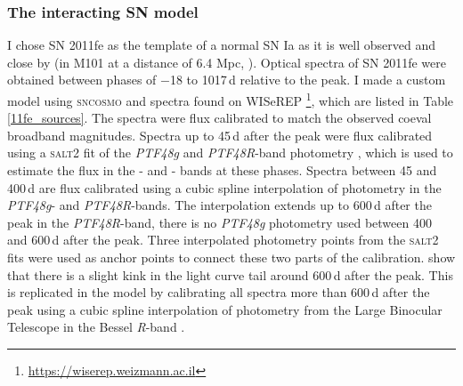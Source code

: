 \documentclass[a4paper,oneside,12pt, class=Latex/Classes/PhDthesisPSnPDF, crop=false]{standalone}
\begin{document}
\subsubsection{The interacting SN model}
\label{model_description}
I chose SN 2011fe as the template of a normal SN Ia as it is well observed and close by (in M101 at a distance of 6.4 Mpc, \citealt{M101_cep_dist}). Optical spectra of SN 2011fe were obtained between phases of $-$18 to 1017\,d relative to the peak. I made a custom model using \textsc{sncosmo} and spectra found on WISeREP \citep{wiserep}\footnote{\url{https://wiserep.weizmann.ac.il}}, which are listed in Table \ref{11fe_sources}. The spectra were flux calibrated to match the observed coeval broadband magnitudes. Spectra up to 45\,d after the peak were flux calibrated using a \textsc{salt2} \citep{salt2} fit of the \textit{PTF48g} and \textit{PTF48R}-band photometry \citep{PTF_1, PTF_2}, which is used to estimate the flux in the \ztfg- and \ztfr- bands at these phases. Spectra between 45 and 400\,d are flux calibrated using a cubic spline interpolation of photometry in the \textit{PTF48g}- and \textit{PTF48R}-bands. The interpolation extends up to 600\,d after the peak in the \textit{PTF48R}-band, there is no \textit{PTF48g} photometry used between 400 and 600\,d after the peak. Three interpolated photometry points from the \textsc{salt2} fits were used as anchor points to connect these two parts of the calibration. \citet{Georgios_11fe} show that there is a slight kink in the light curve tail around 600\,d after the peak. This is replicated in the model by calibrating all spectra more than 600\,d after the peak using a cubic spline interpolation of photometry from the Large Binocular Telescope \citep[LBT;][]{LBT} in the Bessel \textit{R}-band \citep{Shappee_11fe}.
\end{document}
